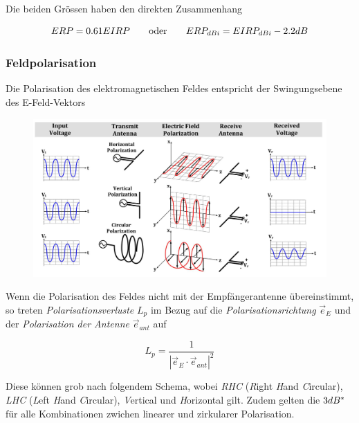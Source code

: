 \documentclass[
  10pt,
  a4paper,
  german]{article}
\numberwithin{equation}{section}
\begin{document}
Die beiden Grössen haben den direkten Zusammenhang

\[
ERP=0.61\space EIRP\qquad\text{oder}\qquad ERP_{dBi}=EIRP_{dBi}-2.2dB
\]

\hypertarget{feldpolarisation}{%
\subsubsection{Feldpolarisation}\label{feldpolarisation}}

Die Polarisation des elektromagnetischen Feldes entspricht der
Swingungsebene des E-Feld-Vektors

\begin{figure}[H]

{\centering \includegraphics{images/04_Polarisation.png}

}

\end{figure}

Wenn die Polarisation des Feldes nicht mit der Empfängerantenne
übereinstimmt, so treten \emph{Polarisationsverluste} \(L_p\) im Bezug
auf die \emph{Polarisationsrichtung} \(\vec{e}_E\) und der
\emph{Polarisation der Antenne} \(\vec{e}_{ant}\) auf

\[
L_p=\frac{1}{|\vec{e}_E\cdot\vec{e}_{ant}|^2}
\]

Diese können grob nach folgendem Schema, wobei \emph{RHC} (\emph{R}ight
\emph{H}and \emph{C}ircular), \emph{LHC} (\emph{L}eft \emph{H}and
\emph{C}ircular), \emph{V}ertical und \emph{H}orizontal gilt. Zudem
gelten die \(3\space dB^*\) für alle Kombinationen zwichen linearer und
zirkularer Polarisation.
\end{document}
